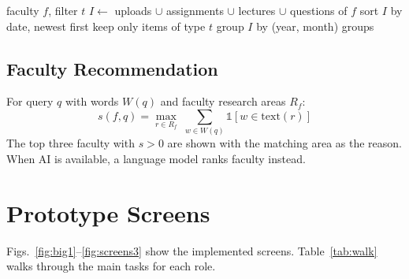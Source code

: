 \documentclass[conference]{IEEEtran}
\begin{document}
\begin{algorithm}[!t]
\caption{Build the All Work timeline}
\label{alg:timeline}
\small
\begin{algorithmic}[1]
\Require faculty $f$, filter $t$
\State $I \gets$ uploads $\cup$ assignments $\cup$ lectures $\cup$ questions of $f$
\State sort $I$ by date, newest first
 \State keep only items of type $t$ \EndIf
\State group $I$ by (year, month)
\State \Return groups
\end{algorithmic}
\end{algorithm}

\subsection{Faculty Recommendation}
For query $q$ with words $W(q)$ and faculty research areas $R_f$:
\begin{equation}
s(f,q)=\max_{r\in R_f}\;\sum_{w\in W(q)} \mathbb{1}\left[w \in \mathrm{text}(r)\right]
\end{equation}
The top three faculty with $s>0$ are shown with the matching area as the reason. When AI is available, a language model ranks faculty instead.

\section{Prototype Screens}
Figs.~\ref{fig:big1}--\ref{fig:screens3} show the implemented screens. Table~\ref{tab:walk} walks through the main tasks for each role.
\end{document}
